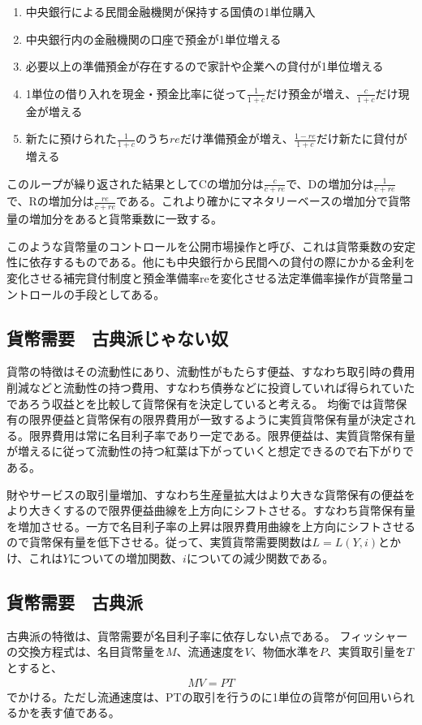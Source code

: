 \documentclass{jsarticle}
\begin{document}
\begin{enumerate}
\item 中央銀行による民間金融機関が保持する国債の1単位購入
\item 中央銀行内の金融機関の口座で預金が1単位増える
\item 必要以上の準備預金が存在するので家計や企業への貸付が1単位増える
\item 1単位の借り入れを現金・預金比率に従って$\frac{1}{1 + c}$だけ預金が増え、$\frac{c}{1 + c}$だけ現金が増える
\item 新たに預けられた$\frac{1}{1 + c}$のうち$re$だけ準備預金が増え、$\frac{1 - re}{1 + c}$だけ新たに貸付が増える
\end{enumerate}
このループが繰り返された結果としてCの増加分は$\frac{c}{c + re}$で、Dの増加分は$\frac{1}{c + re}$で、Rの増加分は$\frac{re}{c + re}$である。これより確かにマネタリーベースの増加分で貨幣量の増加分をあると貨幣乗数に一致する。

このような貨幣量のコントロールを公開市場操作と呼び、これは貨幣乗数の安定性に依存するものである。他にも中央銀行から民間への貸付の際にかかる金利を変化させる補完貸付制度と預金準備率reを変化させる法定準備率操作が貨幣量コントロールの手段としてある。

\subsection{貨幣需要　古典派じゃない奴}
貨幣の特徴はその流動性にあり、流動性がもたらす便益、すなわち取引時の費用削減などと流動性の持つ費用、すなわち債券などに投資していれば得られていたであろう収益とを比較して貨幣保有を決定していると考える。
均衡では貨幣保有の限界便益と貨幣保有の限界費用が一致するように実質貨幣保有量が決定される。限界費用は常に名目利子率であり一定である。限界便益は、実質貨幣保有量が増えるに従って流動性の持つ紅葉は下がっていくと想定できるので右下がりである。

財やサービスの取引量増加、すなわち生産量拡大はより大きな貨幣保有の便益をより大きくするので限界便益曲線を上方向にシフトさせる。すなわち貨幣保有量を増加させる。一方で名目利子率の上昇は限界費用曲線を上方向にシフトさせるので貨幣保有量を低下させる。従って、実質貨幣需要関数は$L = L(Y, i)$とかけ、これは$Y$についての増加関数、$i$についての減少関数である。

\subsection{貨幣需要　古典派}
古典派の特徴は、貨幣需要が名目利子率に依存しない点である。
フィッシャーの交換方程式は、名目貨幣量を$M$、流通速度を$V$、物価水準を$P$、実質取引量を$T$とすると、
\begin{align}
	MV = PT
\end{align}
でかける。ただし流通速度は、PTの取引を行うのに1単位の貨幣が何回用いられるかを表す値である。
\end{document}
